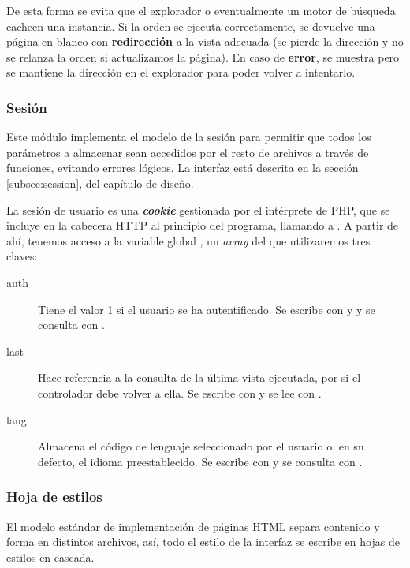 De esta forma se evita que el explorador o eventualmente un motor de búsqueda cacheen una instancia. Si la orden se ejecuta correctamente, se devuelve una página en blanco con \textbf{redirección} a la vista adecuada (se pierde la dirección y no se relanza la orden si actualizamos la página). En caso de \textbf{error}, se muestra pero se mantiene la dirección en el explorador para poder volver a intentarlo.

\subsubsection{Sesión}

Este módulo implementa el modelo de la sesión para permitir que todos los parámetros a almacenar sean accedidos por el resto de archivos a través de funciones, evitando errores lógicos. La interfaz está descrita en la sección \ref{subsec:session}, del capítulo de diseño.

La sesión de usuario es una \textbf{\textit{cookie}} gestionada por el intérprete de \acrshort{PHP}, que se incluye en la cabecera \acrshort{HTTP} al principio del programa, llamando a . A partir de ahí, tenemos acceso a la variable global , un \textit{array} del que utilizaremos tres claves:

\begin{description}
	\item[auth] Tiene el valor 1 si el usuario se ha autentificado. Se escribe con  y  y se consulta con .
	
	\item[last] Hace referencia a la consulta de la última vista ejecutada, por si el controlador debe volver a ella. Se escribe con  y se lee con .
	
	\item[lang] Almacena el código de lenguaje seleccionado por el usuario o, en su defecto, el idioma preestablecido. Se escribe con  y se consulta con .
\end{description}

\subsubsection{Hoja de estilos}

El modelo estándar de implementación de páginas \acrshort{HTML} separa contenido y forma en distintos archivos, así, todo el estilo de la interfaz se escribe en hojas de estilos en cascada.

